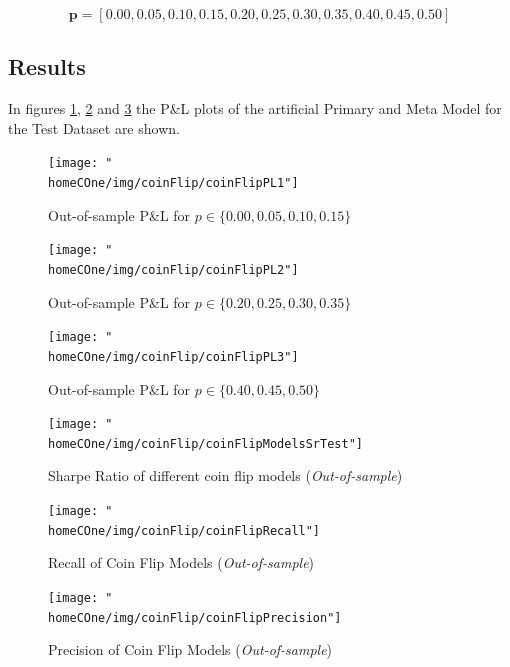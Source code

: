 \documentclass[a4paper]{article}
\newcommand{\homeCOne}{../../Chapter 1 - Metalabeling/Draft}
\begin{document}
\begin{equation*}
	\textbf{p} = [0.00, 0.05, 0.10, 0.15, 0.20, 0.25, 0.30, 0.35, 
	0.40, 0.45, 	0.50]
\end{equation*}

\subsection{Results}

In figures \ref{fig:coinFlipPlots1}, \ref{fig:coinFlipPlots2} and 
\ref{fig:coinFlipPlots3} the P\&L plots of the artificial Primary and 
Meta Model for the Test Dataset are shown.

\begin{figure}[hbtp]
	\centering
	\texttt{[image: "\\homeCOne/img/coinFlip/coinFlipPL1"]}
	\caption{Out-of-sample P\&L for 
	$p \in \{ 0.00, 0.05, 0.10, 0.15\}$}
	\label{fig:coinFlipPlots1}
\end{figure}

\begin{figure}[htbp]
	\centering
	\texttt{[image: "\\homeCOne/img/coinFlip/coinFlipPL2"]}
	\caption{Out-of-sample P\&L for 
	$p \in \{ 0.20, 0.25, 0.30, 0.35\}$}
	\label{fig:coinFlipPlots2}
\end{figure}

\begin{figure}[htbp]
	\centering
	\texttt{[image: "\\homeCOne/img/coinFlip/coinFlipPL3"]}
	\caption{Out-of-sample P\&L for $p \in \{ 0.40, 0.45, 0.50 \}$}
	\label{fig:coinFlipPlots3}
\end{figure}

\begin{figure}[htbp]
	\centering
	\texttt{[image: "\\homeCOne/img/coinFlip/coinFlipModelsSrTest"]}
	\caption{Sharpe Ratio of different coin flip models 
	(\textit{Out-of-sample})}
	\label{fig:coinFlipModelsSrTest}
\end{figure}

\begin{figure}[htbp]
	\centering
	\texttt{[image: "\\homeCOne/img/coinFlip/coinFlipRecall"]}
	\caption{Recall of Coin Flip Models (\textit{Out-of-sample})}
	\label{fig:coinFlipRecallTest}
\end{figure}

\begin{figure}[htbp]
	\centering
	\texttt{[image: "\\homeCOne/img/coinFlip/coinFlipPrecision"]}
	\caption{Precision of Coin Flip Models (\textit{Out-of-sample})}
	\label{fig:coinFlipPrecisionTest}
\end{figure}
\end{document}
